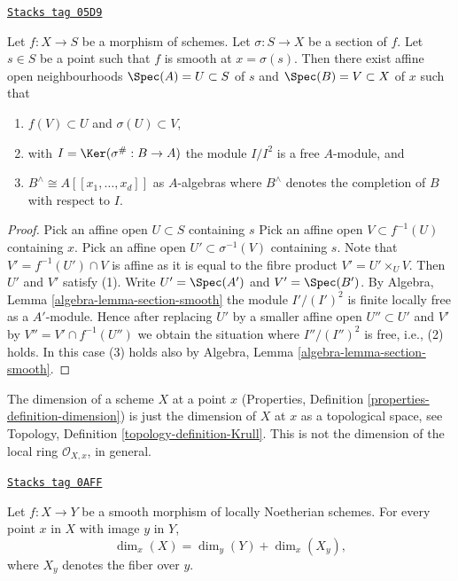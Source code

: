\begin{lemma}
\label{morphisms-lemma-section-smooth-morphism}
\href{https://stacks.math.columbia.edu/tag/05D9}{\texttt{Stacks tag 05D9}}

Let $f : X \to S$ be a morphism of schemes.
Let $\sigma : S \to X$ be a section of $f$.
Let $s \in S$ be a point such that $f$ is smooth at $x = \sigma(s)$.
Then there exist affine open neighbourhoods
$\Spec(A) = U \subset S$ of $s$ and $\Spec(B) = V \subset X$
of $x$ such that
\begin{enumerate}
\item $f(V) \subset U$ and $\sigma(U) \subset V$,
\item with $I = \Ker(\sigma^\# : B \to A)$ the module $I/I^2$
is a free $A$-module, and
\item $B^\wedge \cong A[[x_1, \ldots, x_d]]$ as $A$-algebras where
$B^\wedge$ denotes the completion of $B$ with respect to $I$.
\end{enumerate}
\end{lemma}

\begin{proof}
Pick an affine open $U \subset S$ containing $s$
Pick an affine open $V \subset f^{-1}(U)$ containing $x$.
Pick an affine open $U' \subset \sigma^{-1}(V)$ containing $s$.
Note that $V' = f^{-1}(U') \cap V$ is affine as it is equal to the
fibre product $V' = U' \times_U V$. Then $U'$ and $V'$ satisfy (1).
Write $U' = \Spec(A')$ and $V' = \Spec(B')$. By
Algebra, Lemma \ref{algebra-lemma-section-smooth}
the module $I'/(I')^2$ is finite locally free as a $A'$-module.
Hence after replacing $U'$ by a smaller affine open $U'' \subset U'$
and $V'$ by $V'' = V' \cap f^{-1}(U'')$ we obtain the situation where
$I''/(I'')^2$ is free, i.e., (2) holds. In this case (3) holds also by
Algebra, Lemma \ref{algebra-lemma-section-smooth}.
\end{proof}

The dimension of a scheme $X$ at a point $x$
(Properties, Definition \ref{properties-definition-dimension})
is just the dimension of $X$ at $x$ as a topological space, see
Topology, Definition \ref{topology-definition-Krull}.
This is not the dimension of the local ring $\mathcal{O}_{X,x}$, in general.

\begin{lemma}
\label{morphisms-lemma-smoothness-dimension}
\href{https://stacks.math.columbia.edu/tag/0AFF}{\texttt{Stacks tag 0AFF}}

Let $f : X \to Y$ be a smooth morphism of locally Noetherian schemes.
For every point $x$ in $X$ with image $y$ in $Y$,
$$
\dim_x(X) = \dim_y(Y) + \dim_x(X_y),
$$
where $X_y$ denotes the fiber over $y$.
\end{lemma}


